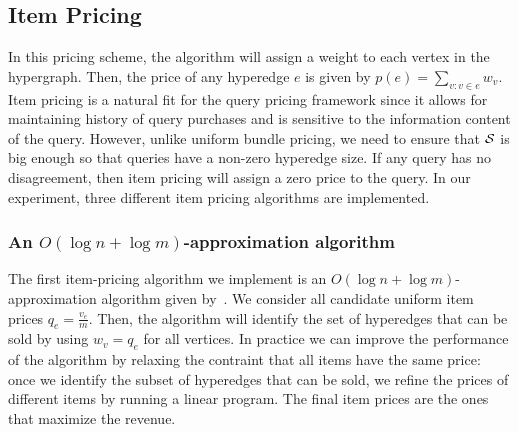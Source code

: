%


\subsection{Item Pricing} 

In this pricing scheme, the algorithm will assign a weight to each vertex in the hypergraph. Then, the price of any hyperedge $e$ is given by $p(e) = \sum_{v : v \in e} w_v$. Item pricing is a natural fit for the query pricing framework since it allows for maintaining history of query purchases and is sensitive to the information content of the query. However, unlike uniform bundle pricing, we need to ensure that $\mathcal{S}$ is big enough so that queries have a non-zero hyperedge size. If any query has no disagreement, then item pricing will assign a zero price to the query. In our experiment, three different item pricing algorithms are implemented.

\subsubsection{An $O(\log n+\log m)$-approximation algorithm}

The first item-pricing algorithm we implement is an $O(\log n+\log m)$-approximation algorithm given by~\cite{guruswami2005profit}. We consider all candidate uniform item prices $q_e = \frac{v_e}{m}$. Then, the algorithm will identify the set of hyperedges that can be sold by using $w_v = q_e$ for all vertices. In practice we can improve the performance of the algorithm by relaxing the contraint that all items have the same price: once we identify the subset of hyperedges that can be sold, we refine the prices of different items by running a linear program. The final item prices are the ones that maximize the revenue. 

